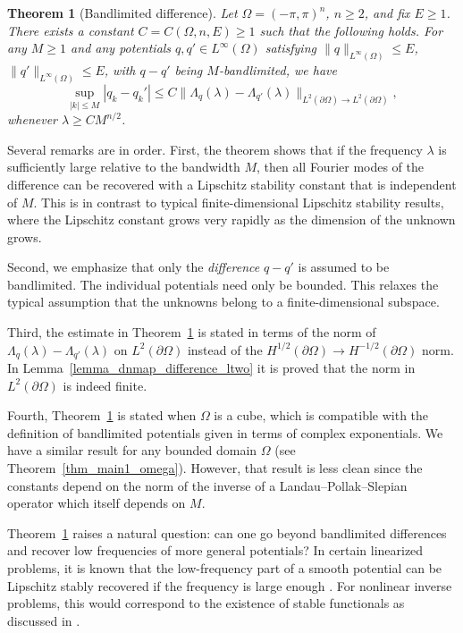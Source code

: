 \documentclass[a4paper, 11pt, twoside, notitlepage]{amsart}
\newtheorem{theorem}{Theorem}[section]
\theoremstyle{definition}
\theoremstyle{remark}
\begin{document}
\begin{theorem}[Bandlimited difference]\label{thm_main1}
Let $\Omega = (-\pi, \pi)^n$, $n \geq 2$, and fix $E \geq 1$. There exists a constant $C = C(\Omega, n, E) \geq 1$ such that the following holds. For any $M \geq 1$ and any potentials $q, q' \in L^{\infty}(\Omega)$ satisfying $
\|q\|_{L^{\infty}(\Omega)} \leq E$, $\|q'\|_{L^{\infty}(\Omega)} \leq E$, 
with $q - q'$ being $M$-bandlimited, we have
\[
\sup_{|k| \leq M} |q_k - q_k'| \leq C \|\Lambda_q(\lambda) - \Lambda_{q'}(\lambda)\|_{L^2(\partial \Omega) \to L^2(\partial \Omega)},
\]
whenever $\lambda \geq C M^{n/2}$. 
\end{theorem}

Several remarks are in order. First, the theorem shows that if the frequency $\lambda$ is sufficiently large relative to the bandwidth $M$, then all Fourier modes of the difference can be recovered with a Lipschitz stability constant that is independent of $M$. This is in contrast to typical finite-dimensional Lipschitz stability results, where the Lipschitz constant grows very rapidly as the dimension of the unknown grows. 

Second, we emphasize that only the \emph{difference} $q - q'$ is assumed to be bandlimited. The individual potentials need only be bounded. This relaxes the typical assumption that the unknowns belong to a finite-dimensional subspace.

Third, the estimate in Theorem~\ref{thm_main1} is stated in terms of the norm of $\Lambda_q(\lambda) - \Lambda_{q'}(\lambda)$ on $L^2(\partial \Omega)$ instead of the $H^{1/2}(\partial \Omega) \to H^{-1/2}(\partial \Omega)$ norm. In Lemma~\ref{lemma_dnmap_difference_ltwo} it is proved that the norm in $L^2(\partial \Omega)$ is indeed finite.

Fourth, Theorem~\ref{thm_main1} is stated when $\Omega$ is a cube, which is compatible with the definition of bandlimited potentials given in terms of complex exponentials. We have a similar result for any bounded domain $\Omega$ (see Theorem~\ref{thm_main1_omega}). However, that result is less clean since the constants depend on the norm of the inverse of a Landau--Pollak--Slepian operator which itself depends on $M$.

Theorem~\ref{thm_main1} raises a natural question: can one go beyond bandlimited differences and recover low frequencies of more general potentials? In certain linearized problems, it is known that the low-frequency part of a smooth potential can be Lipschitz stably recovered if the frequency is large enough \cite{kow_increasing_2025}. For nonlinear inverse problems, this would correspond to the existence of stable functionals as discussed in \cite{ALESSANDRINI2005207}.
\end{document}
